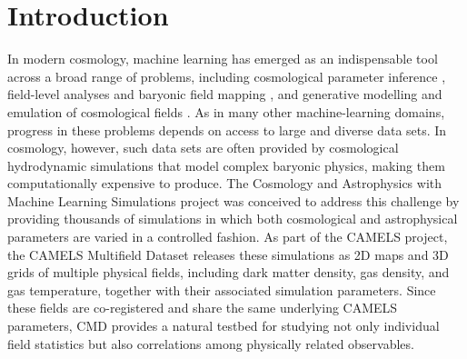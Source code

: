 \documentclass[usenatbib]{mnras}
\begin{document}


\section{Introduction}
\label{sec:intro}
In modern cosmology, machine learning has emerged as an indispensable
tool across a broad range of problems,
including cosmological parameter inference
\citep{Ravanbakhsh2017,Cranmer2020}, field-level analyses and baryonic
field mapping \citep{JoKim2019,Zhang2019}, and generative modelling
and emulation of cosmological fields
\citep{Mustafa2019,He2019,Perraudin2021}.
As in many other machine-learning domains, progress in these problems
depends on access to large and diverse data sets. In cosmology, however,
such data sets are often provided by cosmological hydrodynamic
simulations that model complex baryonic physics, making them
computationally expensive to produce.
The Cosmology and Astrophysics with Machine Learning Simulations
\citep[CAMELS;][]{Villaescusa2021} project was conceived to address
this challenge by providing thousands of simulations in which both
cosmological and astrophysical parameters are varied in a controlled
fashion. As part of the CAMELS project, the CAMELS Multifield Dataset \citep[CMD;][]{Villaescusa2022}
releases these simulations as 2D maps and 3D grids of multiple
physical fields, including dark matter density, gas density, and gas temperature, 
together with their associated simulation parameters.
Since these fields are co-registered and share the same underlying
CAMELS parameters, CMD provides a natural testbed for studying not
only individual field statistics but also correlations among
physically related observables.
\end{document}
